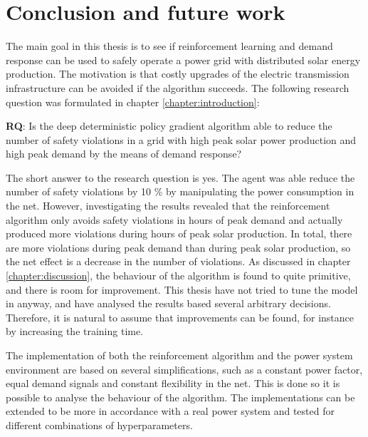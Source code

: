 \documentclass[class=book, crop=false]{standalone}
\begin{document}
\chapter{Conclusion and future work}
The main goal in this thesis is to see if reinforcement learning and demand response can be used to safely operate a power grid with distributed solar energy production. The motivation is that costly upgrades of the electric transmission infrastructure can be avoided if the algorithm succeeds. The following research question was formulated in chapter \ref{chapter:introduction}: 

\begin{displayquote}
\textbf{RQ}: Is the deep deterministic policy gradient algorithm able to reduce the number of safety violations in a grid with high peak solar power production and high peak demand by the means of demand response? 
\end{displayquote}
The short answer to the research question is yes. The agent was able reduce the number of safety violations by 10 \% by manipulating the power consumption in the net. However, investigating the results revealed that the reinforcement algorithm only avoids safety violations in hours of peak demand and actually produced more violations during hours of peak solar production. In total, there are more violations during peak demand than during peak solar production, so the net effect is a decrease in the number of violations. As discussed in chapter \ref{chapter:discussion}, the behaviour of the algorithm is found to quite primitive, and there is room for improvement. This thesis have not tried to tune the model in anyway, and have analysed the results based several arbitrary decisions. Therefore, it is natural to assume that improvements can be found, for instance by increasing the training time. 

The implementation of both the reinforcement algorithm and the power system environment are based on several simplifications, such as a constant power factor, equal demand signals and constant flexibility in the net. This is done so it is possible to analyse the behaviour of the algorithm. The implementations can be extended to be more in accordance with a real power system and tested for different combinations of hyperparameters.          
\end{document}
